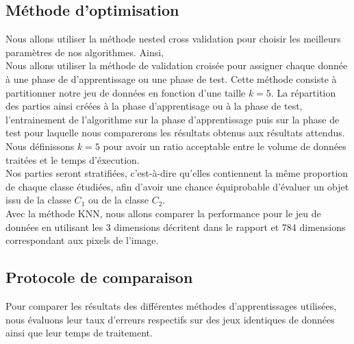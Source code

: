 \documentclass[a4paper,10pt]{article}
\begin{document}
	\subsection{Méthode d'optimisation}
		Nous allons utiliser la méthode nested cross validation pour choisir les meilleurs paramètres de nos algorithmes. Ainsi, \\
		Nous allons utiliser la méthode de validation croisée pour assigner chaque donnée à une phase de d'apprentissage ou une phase de test. Cette méthode consiste à partitionner notre jeu de données en fonction d'une taille $k=5$. La répartition des parties ainsi créées à la phase d'apprentisage ou à la phase de test, l'entrainement de l'algorithme sur la phase d'apprentissage puis sur la phase de test pour laquelle nous comparerons les résultats obtenus aux résultats attendus. \\
		Nous définissons $k=5$ pour avoir un ratio acceptable entre le volume de données traitées et le temps d'éxecution.\\
		Nos parties seront stratifiées, c'est-à-dire qu'elles contiennent la même proportion de chaque classe étudiées, afin d'avoir une chance équiprobable d'évaluer un objet issu de la classe $C_1$ ou de la classe $C_2$.\\
		Avec la méthode KNN, nous allons comparer la performance pour le jeu de données en utilisant les 3 dimensions décritent dans le rapport et 784 dimensions correspondant aux pixels de l'image. 
	\subsection{Protocole de comparaison}
		Pour comparer les résultats des différentes méthodes d'apprentissages utilisées, nous évaluons leur taux d’erreurs respectifs sur des jeux identiques de données ainsi que leur temps de traitement.
\end{document}
